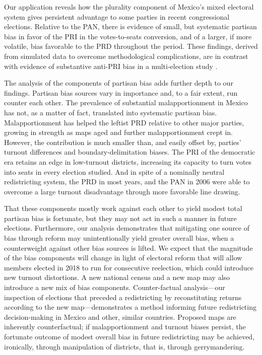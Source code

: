 \documentclass[letter,12pt]{article}
\begin{document}
{Our application reveals how the plurality component of Mexico's mixed electoral system gives persistent advantage to some parties in recent congressional elections. Relative to the PAN, there is evidence of small, but systematic partisan bias in favor of the PRI in the votes-to-seats conversion, and of a larger, if more volatile, bias favorable to the PRD throughout the period. These findings, derived from simulated data to overcome methodological complications, are in contrast with evidence of substantive anti-PRI bias in a multi-election study \citep{marquez2014biasBlog}. 

The analysis of the components of partisan bias adds further depth to our findings. Partisan bias sources vary in importance and, to a fair extent, run counter each other. The prevalence of substantial malapportionment in Mexico has not, as a matter of fact, translated into systematic partisan bias. Malapportionment has helped the leftist PRD relative to other major parties, growing in strength as maps aged and further malapportionment crept in. However, the contribution is much smaller than, and easily offset by, parties' turnout differences and boundary-delimitation biases. The PRI of the democratic era retains an edge in low-turnout districts, increasing its capacity to turn votes into seats in every election studied. And in spite of a nominally neutral redistricting system, the PRD in most years, and the PAN in 2006 were able to overcome a large turnout disadvantage through more favorable line drawing. 

That these components mostly work against each other to yield modest total partisan bias is fortunate, but they may not act in such a manner in future elections. Furthermore, our analysis demonstrates that mitigating one source of bias through reform may unintentionally yield greater overall bias, when a counterweight against other bias sources is lifted. We expect that the magnitude of the bias components will change in light of electoral reform that will allow members elected in 2018 to run for consecutive reelection, which could introduce new turnout distortions. A new national census and a new map may also introduce a new mix of bias components. Counter-factual analysis---our inspection of elections that preceded a redistricting by reconstituting returns according to the new map---demonstrates a method informing future redistricting decision-making in Mexico and other, similar countries. Proposed maps are inherently counterfactual; if malapportionment and turnout biases persist, the fortunate outcome of modest overall bias in future redistricting may be achieved, ironically, through manipulation of districts, that is, through gerrymandering.

}
\end{document}
